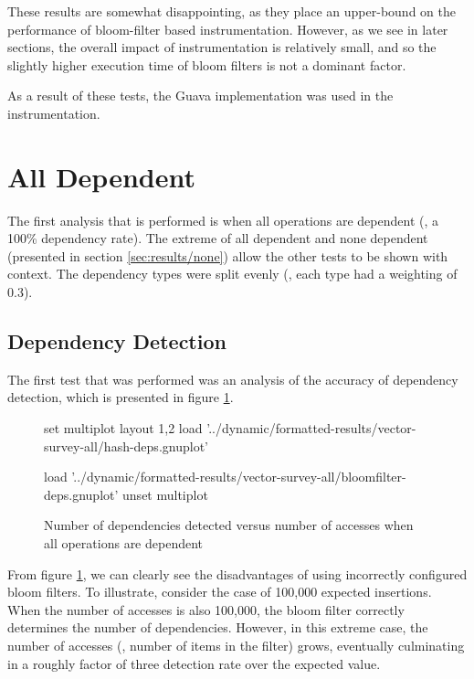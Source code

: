 These results are somewhat disappointing, as they place an upper-bound on the performance of bloom-filter based instrumentation. However, as we see in later sections, the overall impact of instrumentation is relatively small, and so the slightly higher execution time of bloom filters is not a dominant factor.

As a result of these tests, the Guava implementation was used in the instrumentation.

\section{All Dependent} \label{sec:result/all}
	The first analysis that is performed is when all operations are dependent (\ie, a 100\% dependency rate). The extreme of all dependent and none dependent (presented in section \ref{sec:results/none}) allow the other tests to be shown with context. The dependency types were split evenly (\ie, each type had a weighting of 0.3).

	\subsection{Dependency Detection} \label{sec:results/all/deps}
	The first test that was performed was an analysis of the accuracy of dependency detection, which is presented in figure \ref{chart:all-dep}.
	
	\begin{figure}
		\centering
		\begin{gnuplot}[terminal=pdf]
			set multiplot layout 1,2
				load '../dynamic/formatted-results/vector-survey-all/hash-deps.gnuplot'
				
				load '../dynamic/formatted-results/vector-survey-all/bloomfilter-deps.gnuplot'
			unset multiplot
		\end{gnuplot}
		\caption{Number of dependencies detected versus number of accesses when all operations are dependent}
		\label{chart:all-dep}
	\end{figure}
	
	From figure \ref{chart:all-dep}, we can clearly see the disadvantages of using incorrectly configured bloom filters. To illustrate, consider the case of 100,000 expected insertions. When the number of accesses is also 100,000, the bloom filter correctly determines the number of dependencies. However, in this extreme case, the number of accesses (\ie, number of items in the filter) grows, eventually culminating in a roughly factor of three detection rate over the expected value.
	
